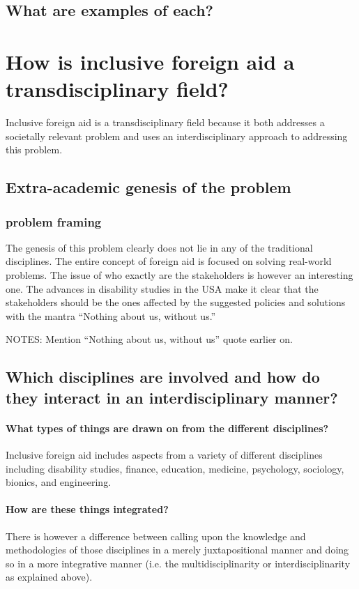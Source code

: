 \documentclass{lps}
\begin{document}
\subsection{What are examples of each?}

\section{How is inclusive foreign aid a transdisciplinary field?}
Inclusive foreign aid is a transdisciplinary field because it both addresses a societally relevant problem and uses an interdisciplinary approach to addressing this problem. 
\subsection{Extra-academic genesis of the problem}
\subsubsection{problem framing}
The genesis of this problem clearly does not lie in any of the traditional disciplines. The entire concept of foreign aid is focused on solving real-world problems. The issue of who exactly are the stakeholders is however an interesting one. The advances in disability studies in the USA make it clear that the stakeholders should be the ones affected by the suggested policies and solutions with the mantra “Nothing about us, without us.” 


NOTES:
Mention “Nothing about us, without us” quote earlier on.
\subsection{Which disciplines are involved and how do they interact in an
interdisciplinary manner?}
\paragraph{What types of things are drawn on from the different disciplines?}
Inclusive foreign aid includes aspects from a variety of different disciplines including disability studies, finance, education, medicine, psychology, sociology, bionics, and engineering. 
\paragraph{How are these things integrated?}

There is however a difference between calling upon the knowledge and methodologies of those disciplines in a merely juxtapositional manner and doing so in a more integrative manner (i.e. the multidisciplinarity or interdisciplinarity as explained above).
\end{document}
